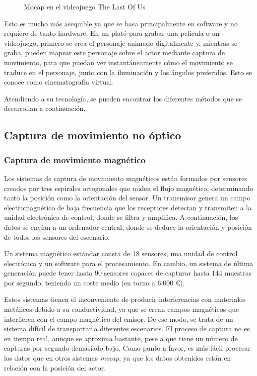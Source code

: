 \begin{figure}[h!]
    \centering
    \caption{Mocap en el videojuego The Last Of Us}
    \label{fig:TheLastOfUs}  
\end{figure}

Esto es mucho más asequible ya que se basa principalmente en software y no requiere de tanto hardware. En un plató para grabar una película o un videojuego, primero se crea el personaje animado digitalmente y, mientras se graba, pueden mapear este personaje sobre el actor mediante captura de movimiento, para que puedan ver instantáneamente cómo el movimiento se traduce en el personaje, junto con la iluminación y los ángulos preferidos. Esto se conoce como cinematografía virtual.

Atendiendo a su tecnología, se pueden encontrar los diferentes métodos que se desarrollan a continuación.

\subsection{Captura de movimiento no óptico}

\subsubsection{Captura de movimiento magnético}

Los sistemas de captura de movimiento magnéticos están formados por sensores creados por tres espirales ortogonales que miden el flujo magnético, determinando tanto la posición como la orientación del sensor. Un transmisor genera un campo electromagnético de baja frecuencia que los receptores detectan y transmiten a la unidad electrónica de control, donde se filtra y amplifica. A continuación, los datos se envían a un ordenador central, donde se deduce la orientación y posición de todos los sensores del escenario. 

Un sistema magnético estándar consta de 18 sensores, una unidad de control electrónica y un software para el procesamiento. En cambio, un sistema de última generación puede tener hasta 90 sensores capaces de capturar hasta 144 muestras por segundo, teniendo un coste medio (en torno a 6.000 \euro).

Estos sistemas tienen el inconveniente de producir interferencias con materiales metálicos debido a su conductividad, ya que se crean campos magnéticos que interfieren con el campo magnético del emisor. De ese modo, se trata de un sistema difícil de transportar a diferentes escenarios. El proceso de captura no es en tiempo real, aunque se aproxima bastante, pese a que tiene un número de capturas por segundo demasiado bajo. Como punto a favor, es más fácil procesar los datos que en otros sistemas \textit{mocap}, ya que los datos obtenidos están en relación con la posición del actor.


